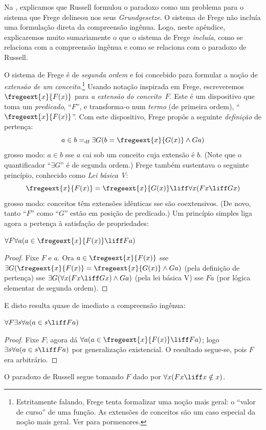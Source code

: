 \documentclass[../../../include/open-logic-section]{subfiles}
\begin{document}


Na , explicamos que Russell formulou o
paradoxo como um problema para o sistema que Frege delineou nos seus
\emph{Grundgesetze}. O sistema de Frege não incluía uma formulação direta
da compreensão ingênua. Logo, neste apêndice, explicaremos muito
sumariamente o que o sistema de Frege \emph{incluía}, como se relaciona com a compreensão ingênua e como se relaciona com o
paradoxo de Russell.

O sistema de Frege é de \emph{segunda ordem} e foi concebido para formular
a noção de \emph{extensão de um conceito}.\footnote{Estritamente
falando, Frege tenta formalizar uma noção mais geral: o
``valor de curso'' de uma função. As extensões de conceitos são um caso
especial da noção mais geral. Ver \citet[pp.\ 8--9]{Heck2012} para
pormenores.} Usando notação inspirada em Frege, escreveremos
$\fregeext{x}{F(x)}$ para \emph{a extensão do conceito~$F$}. Este
é um dispositivo que toma um \emph{predicado}, ``$F$'', e transforma-o num
\emph{termo} (de primeira ordem), ``$\fregeext{x}{F(x)}$''. Com este
dispositivo, Frege propôs a seguinte \emph{definição} de pertença:
\[
	a \in b =_\text{df} \exists G(b = \fregeext{x}{G(x)} \land Ga)
\]
grosso modo: $a \in b$ sse $a$ cai sob um conceito cuja extensão é
$b$. (Note que o quantificador ``$\exists G$'' é de segunda ordem.) Frege
também sustentava o seguinte princípio, conhecido como \emph{Lei básica V}: 
$$\fregeext{x}{F(x)} = \fregeext{x}{G(x)} \liff \forall x (Fx \liff Gx)$$
grosso modo: conceitos têm extensões idênticas sse são coextensivos. (De novo, tanto ``$F$'' como ``$G$'' estão em posição de predicado.) Um princípio simples liga agora a pertença à satisfação de propriedades:

\begin{lem}
$\forall F \forall a(a \in \fregeext{x}{F(x)} \liff Fa)$
\end{lem}

\begin{proof} 
Fixe $F$ e $a$. Ora $a \in \fregeext{x}{F(x)}$ sse $\exists G(\fregeext{x}{F(x)}
= \fregeext{x}{G(x)} \land Ga)$ (pela definição de pertença) sse
$\exists G(\forall x(Fx \liff Gx) \land Ga)$ (pela lei básica V) sse $Fa$
(por lógica elementar de segunda ordem).
\end{proof}

E disto resulta quase de imediato a compreensão ingênua:

\begin{lem}
$\forall F \exists s \forall a (a \in s \liff Fa)$
\end{lem}

\begin{proof}
Fixe $F$; agora  dá $\forall a (a \in
\fregeext{x}{F(x)} \liff Fa)$; logo $\exists s\forall a(a \in s \liff Fa)$ por
generalização existencial. O resultado segue-se, pois $F$ era
arbitrário.
\end{proof}

O paradoxo de Russell segue tomando $F$ dado por $\forall x(Fx \liff x \notin x)$. 
\end{document}
